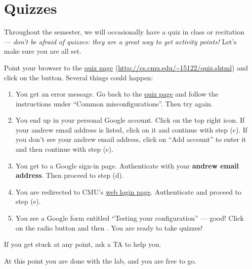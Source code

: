 \section*{Quizzes}

Throughout the semester, we will occasionally have a quiz in class or
recitation --- \emph{don't be afraid of quizzes: they are a great way
  to get activity points!}  Let's make sure you are all set.

\begin{part}
  Point your browser to the
  \href{http://cs.cmu.edu/~15122/quiz.shtml}{quiz page}
  (\url{http://cs.cmu.edu/~15122/quiz.shtml}) and click on the
   button.  Several things could happen:
  \begin{enumerate}
  \item%
    You get an error message.  Go back to the
    \href{http://cs.cmu.edu/~15122/quiz.shtml}{quiz page} and follow
    the instructions under ``Common misconfigurations''.  Then try again.
  \item%
    You end up in your personal Google account.  Click on the top
    right icon.  If your andrew email address is listed, click on it
    and continue with step (c).  If you don't see your andrew email
    address, click on ``Add account'' to enter it and then continue
    with step (c).
  \item%
    You get to a Google sign-in page.  Authenticate with your
    \textbf{andrew email address}.  Then proceed to step (d).
  \item%
    You are redirected to CMU's \href{https://login.cmu.edu/}{web
      login page}.  Authenticate and proceed to step (e).
  \item%
    You see a Google form entitled ``Testing your configuration'' ---
    good!  Click on the radio button and then .
    You are ready to take quizzes!
  \end{enumerate}
  If you get stuck at any point, ask a TA to help you.
\end{part}

\bigskip
At this point you are done with the lab, and you are free to go.
